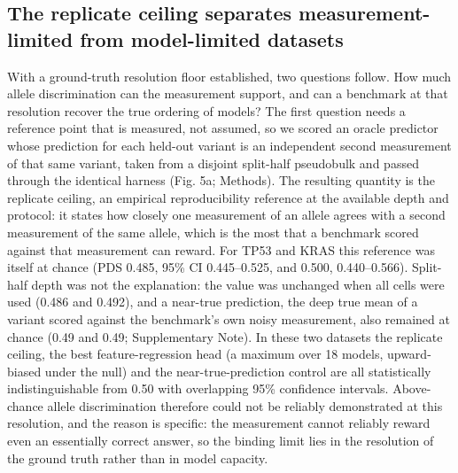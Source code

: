 \documentclass[11pt,letterpaper]{article}
\begin{document}
\subsection*{The replicate ceiling separates measurement-limited from model-limited datasets}

With a ground-truth resolution floor established, two questions follow. How much allele discrimination can the measurement support, and can a benchmark at that resolution recover the true ordering of models? The first question needs a reference point that is measured, not assumed, so we scored an oracle predictor whose prediction for each held-out variant is an independent second measurement of that same variant, taken from a disjoint split-half pseudobulk and passed through the identical harness (Fig. 5a; Methods). The resulting quantity is the replicate ceiling, an empirical reproducibility reference at the available depth and protocol: it states how closely one measurement of an allele agrees with a second measurement of the same allele, which is the most that a benchmark scored against that measurement can reward. For TP53 and KRAS this reference was itself at chance (PDS 0.485, 95\% CI 0.445--0.525, and 0.500, 0.440--0.566). Split-half depth was not the explanation: the value was unchanged when all cells were used (0.486 and 0.492), and a near-true prediction, the deep true mean of a variant scored against the benchmark's own noisy measurement, also remained at chance (0.49 and 0.49; Supplementary Note). In these two datasets the replicate ceiling, the best feature-regression head (a maximum over 18 models, upward-biased under the null) and the near-true-prediction control are all statistically indistinguishable from 0.50 with overlapping 95\% confidence intervals. Above-chance allele discrimination therefore could not be reliably demonstrated at this resolution, and the reason is specific: the measurement cannot reliably reward even an essentially correct answer, so the binding limit lies in the resolution of the ground truth rather than in model capacity.
\end{document}
